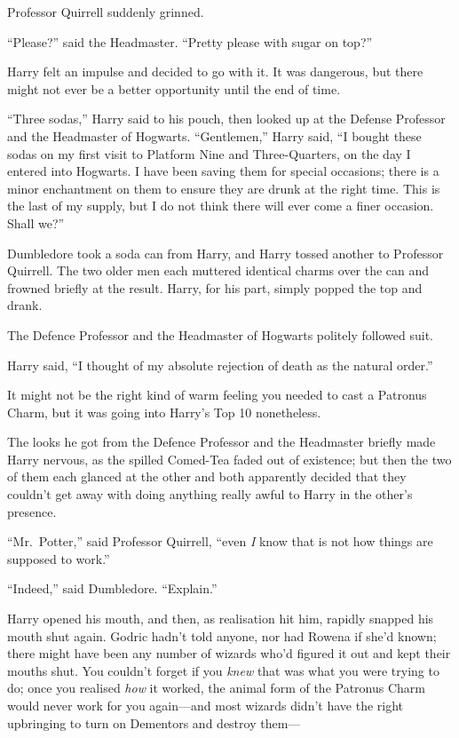 Professor Quirrell suddenly grinned.

``Please?'' said the Headmaster. ``Pretty please with sugar on top?''

Harry felt an impulse and decided to go with it. It was dangerous, but
there might not ever be a better opportunity until the end of time.

``Three sodas,'' Harry said to his pouch, then looked up at the Defense
Professor and the Headmaster of Hogwarts. ``Gentlemen,'' Harry said, ``I
bought these sodas on my first visit to Platform Nine and
Three-Quarters, on the day I entered into Hogwarts. I have been saving
them for special occasions; there is a minor enchantment on them to
ensure they are drunk at the right time. This is the last of my supply,
but I do not think there will ever come a finer occasion. Shall we?''

Dumbledore took a soda can from Harry, and Harry tossed another to
Professor Quirrell. The two older men each muttered identical charms
over the can and frowned briefly at the result. Harry, for his part,
simply popped the top and drank.

The Defence Professor and the Headmaster of Hogwarts politely followed
suit.

Harry said, ``I thought of my absolute rejection of death as the natural
order.''

It might not be the right kind of warm feeling you needed to cast a
Patronus Charm, but it was going into Harry's Top 10 nonetheless.

The looks he got from the Defence Professor and the Headmaster briefly
made Harry nervous, as the spilled Comed-Tea faded out of existence; but
then the two of them each glanced at the other and both apparently
decided that they couldn't get away with doing anything really awful to
Harry in the other's presence.

``Mr.~Potter,'' said Professor Quirrell, ``even \emph{I} know that is
not how things are supposed to work.''

``Indeed,'' said Dumbledore. ``Explain.''

Harry opened his mouth, and then, as realisation hit him, rapidly
snapped his mouth shut again. Godric hadn't told anyone, nor had Rowena
if she'd known; there might have been any number of wizards who'd
figured it out and kept their mouths shut. You couldn't forget if you
\emph{knew} that was what you were trying to do; once you realised
\emph{how} it worked, the animal form of the Patronus Charm would never
work for you again---and most wizards didn't have the right upbringing
to turn on Dementors and destroy them---

